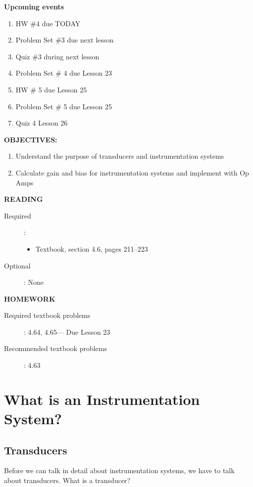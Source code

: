 \documentclass{handout}
\begin{document}
\maketitle

\textbf{Upcoming events}
\begin{enumerate}
\item HW \#4 due TODAY
\item Problem Set \#3 due next lesson
\item Quiz \#3 during next lesson
\item Problem Set \# 4 due Lesson 23
\item HW \# 5 due Lesson 25
\item Problem Set \# 5 due Lesson 25
\item Quiz 4 Lesson 26
\end{enumerate}

\textbf{OBJECTIVES:}
\begin{enumerate}
\item Understand the purpose of transducers and instrumentation systems
\item Calculate gain and bias for instrumentation systems and implement with Op Amps
\end{enumerate}

\textbf{READING}
\begin{description}
\item [Required]:
\begin{itemize}
\item  Textbook, section 4.6, pages 211--223
\end{itemize}
\item [Optional]: None
\end{description}

\textbf{HOMEWORK}
\begin{description}
\item [Required textbook problems]: 4.64, 4.65--- Due Lesson 23
\item [Recommended textbook problems]: 4.63
\end{description}

\section{What is an Instrumentation System?}
\subsection{Transducers}
Before we can talk in detail about instrumentation systems, we have to talk about transducers.  What is a transducer?
\end{document}
